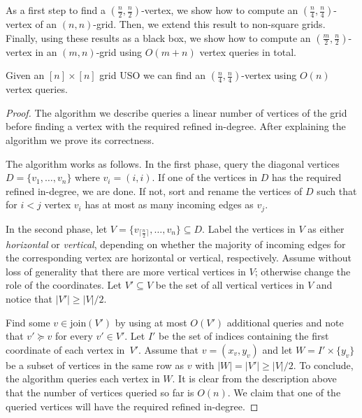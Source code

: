 \documentclass[runningheads,a4paper]{llncs}
\newcommand{\indegree}{refined in-degree\xspace}
\newcommand{\join}{\mbox{join}\xspace}
\begin{document}
As a first step to find a $(\frac{n}{2}, \frac{n}{2})$-vertex, we show how to compute an $(\frac{n}{4}, \frac{n}{4})$-vertex of an $(n, n)$-grid. Then, we extend this result to non-square grids. Finally, using these results as a black box, we show how to compute an $(\frac{m}{2}, \frac{n}{2})$-vertex in an $(m,n)$-grid using $O(m+n)$ vertex queries in total.

\begin{lemma}
\label{lem:seed_lemma_for_square_matrices}
 Given an $[n]\times [n]$ grid USO we can find an $(\frac{n}{4}, \frac{n}{4})$-vertex using $O(n)$ vertex queries.
\end{lemma}

\begin{proof}
The algorithm we describe queries a linear number of vertices of the grid before finding a vertex with the required \indegree. 
After explaining the algorithm we prove its correctness.

The algorithm works as follows. In the first phase, query the diagonal vertices $D = \{v_1,\ldots, v_n\}$ where $v_i = (i,i)$.
If one of the vertices in $D$ has the required \indegree, we are done. 
If not, sort and rename the vertices of $D$ such that for $i < j$ vertex $v_i$ has at most as many incoming edges as $v_j$. 

In the second phase, let $V = \{v_{\lceil \frac{n}{2} \rceil},\ldots,v_n\} \subseteq D$.
Label the vertices in $V$ as either \emph{horizontal}  or \emph{vertical}, depending on whether the majority of incoming edges for the corresponding vertex are horizontal  or vertical, respectively. 
Assume without loss of generality that there are more vertical vertices in $V$; otherwise change the role of the coordinates. 
Let $V' \subseteq V$ be the set of all vertical vertices in $V$ and notice that $|V'| \geq |V|/2$.

Find some $v \in \join(V')$ by using at most $O(V')$ additional queries and note that $v' \succeq v$ for every $v' \in V'$. Let $I'$ be the set of indices containing the first coordinate of each vertex in~$V'$. 
Assume that $v = (x_v, y_v)$ and let $W = I'\times \{y_v\}$ be a subset of vertices in the same row as $v$ with $|W| = |V'|\geq |V|/2$.
To conclude, the algorithm queries each vertex in $W$.
It is clear from the description above that the number of vertices queried so far is $O(n)$. 
We claim that one of the queried vertices will have the required \indegree.


\end{proof}
\end{document}
